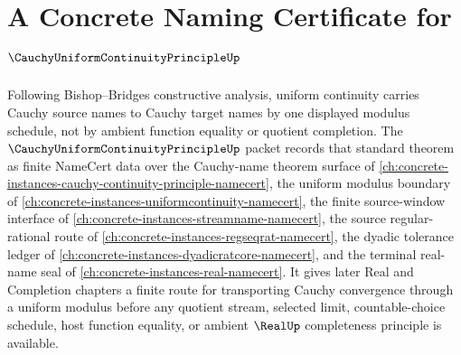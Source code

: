 \chapter{A Concrete Naming Certificate for $\CauchyUniformContinuityPrincipleUp$}
\label{ch:concrete-instances-cauchy-uniform-continuity-principle-namecert}

Following Bishop--Bridges constructive analysis, uniform continuity carries Cauchy source names to Cauchy target names by one displayed modulus schedule, not by ambient function equality or quotient completion. The $\CauchyUniformContinuityPrincipleUp$ packet records that standard theorem as finite NameCert data over the Cauchy-name theorem surface of \autoref{ch:concrete-instances-cauchy-continuity-principle-namecert}, the uniform modulus boundary of \autoref{ch:concrete-instances-uniformcontinuity-namecert}, the finite source-window interface of \autoref{ch:concrete-instances-streamname-namecert}, the source regular-rational route of \autoref{ch:concrete-instances-regseqrat-namecert}, the dyadic tolerance ledger of \autoref{ch:concrete-instances-dyadicratcore-namecert}, and the terminal real-name seal of \autoref{ch:concrete-instances-real-namecert}. It gives later Real and Completion chapters a finite route for transporting Cauchy convergence through a uniform modulus before any quotient stream, selected limit, countable-choice schedule, host function equality, or ambient $\RealUp$ completeness principle is available.

